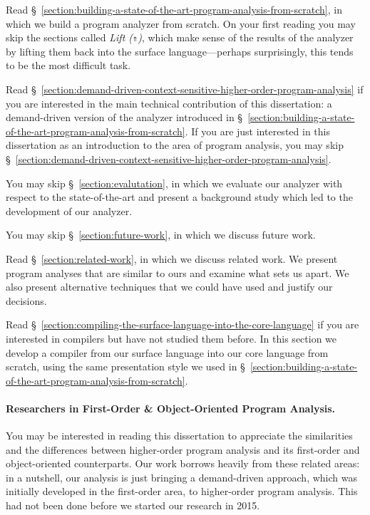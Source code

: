 \documentclass[12pt, oneside]{book}
\begin{document}
Read §~\ref{section:building-a-state-of-the-art-program-analysis-from-scratch}, in which we build a program analyzer from scratch. On your first reading you may skip the sections called \emph{Lift (\texttt{⇑})}, which make sense of the results of the analyzer by lifting them back into the surface language—perhaps surprisingly, this tends to be the most difficult task.

Read §~\ref{section:demand-driven-context-sensitive-higher-order-program-analysis} if you are interested in the main technical contribution of this dissertation: a demand-driven version of the analyzer introduced in §~\ref{section:building-a-state-of-the-art-program-analysis-from-scratch}. If you are just interested in this dissertation as an introduction to the area of program analysis, you may skip §~\ref{section:demand-driven-context-sensitive-higher-order-program-analysis}.

You may skip §~\ref{section:evalutation}, in which we evaluate our analyzer with respect to the state-of-the-art and present a background study which led to the development of our analyzer.

You may skip §~\ref{section:future-work}, in which we discuss future work.

Read §~\ref{section:related-work}, in which we discuss related work. We present program analyses that are similar to ours and examine what sets us apart. We also present alternative techniques that we could have used and justify our decisions.

Read §~\ref{section:compiling-the-surface-language-into-the-core-language} if you are interested in compilers but have not studied them before. In this section we develop a compiler from our surface language into our core language from scratch, using the same presentation style we used in §~\ref{section:building-a-state-of-the-art-program-analysis-from-scratch}.

\paragraph{Researchers in First-Order \& Object-Oriented Program Analysis.}

You may be interested in reading this dissertation to appreciate the similarities and the differences between higher-order program analysis and its first-order and object-oriented counterparts. Our work borrows heavily from these related areas: in a nutshell, our analysis is just bringing a demand-driven approach, which was initially developed in the first-order area, to higher-order program analysis. This had not been done before we started our research in 2015.
\end{document}
